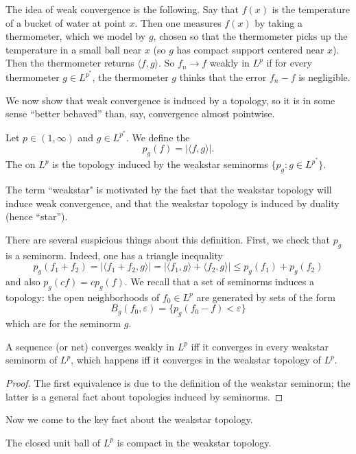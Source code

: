 The idea of weak convergence is the following. Say that $f(x)$ is the temperature of a bucket of water at point $x$.
Then one measures $f(x)$ by taking a thermometer, which we model by $g$, chosen so that the thermometer picks up the temperature in a small ball near $x$ (so $g$ has compact support centered near $x$).
Then the thermometer returns $\langle f, g\rangle$.
So $f_{n} \to f$ weakly in $L^p$ if for every thermometer $g \in L^{p^*}$, the thermometer $g$ thinks that the error $f_{n} - f$ is negligible.

We now show that weak convergence is induced by a topology, so it is in some sense ``better behaved'' than, say, convergence almost pointwise.

\begin{definition}
Let $p \in (1, \infty)$ and $g \in L^{p^*}$.
We define the 
\[p_g(f) = |\langle f, g\rangle|.\]
The  on $L^p$ is the topology induced by the weakstar seminorms $\{p_g: g \in L^{p^*}\}$.
\end{definition}

The term ``weakstar" is motivated by the fact that the weakstar topology will induce weak convergence, and that the weakstar topology is induced by duality (hence ``star'').

There are several suspicious things about this definition. First, we check that $p_g$ is a seminorm. Indeed, one has a triangle inequality
\[p_g(f_1 + f_2) = |\langle f_1 + f_2, g\rangle| = |\langle f_1, g\rangle + \langle f_2, g\rangle| \leq p_g(f_1) + p_g(f_2)\]
and also $p_g(cf) = cp_g(f)$.
We recall that a set of seminorms induces a topology: the open neighborhoods of $f_0 \in L^p$ are generated by sets of the form
\[B_g(f_0, \varepsilon) = \{p_g(f_0 - f) < \varepsilon\}\]
which are  for the seminorm $g$.

\begin{lemma}
A sequence (or net) converges weakly in $L^p$ iff it converges in every weakstar seminorm of $L^p$, which happens iff it converges in the weakstar topology of $L^p$.
\end{lemma}
\begin{proof}
The first equivalence is due to the definition of the weakstar seminorm; the latter is a general fact about topologies induced by seminorms.
\end{proof}

Now we come to the key fact about the weakstar topology.

\begin{theoremx}
The closed unit ball of $L^p$ is compact in the weakstar topology.
\end{theoremx}

